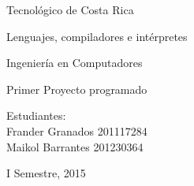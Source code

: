 \documentclass[12pt,a4paper]{report}
\begin{document}
\begin{center}
{\LARGE Tecnol\'{o}gico de Costa Rica \\[2 cm]}

{\Large Lenguajes, compiladores e intérpretes \\[3 cm]}

{\Large Ingenier\'{i}a en Computadores \\[3 cm]}

{\Large Primer Proyecto programado \\[3 cm]}

{\large Estudiantes: \\[0.3 cm] }
{\Large Frander Granados 201117284 \\}
{\Large Maikol Barrantes 201230364\\[3 cm]}

{\Large I Semestre, 2015 \\[2 cm] }
\end{center}


\newpage
\end{document}
